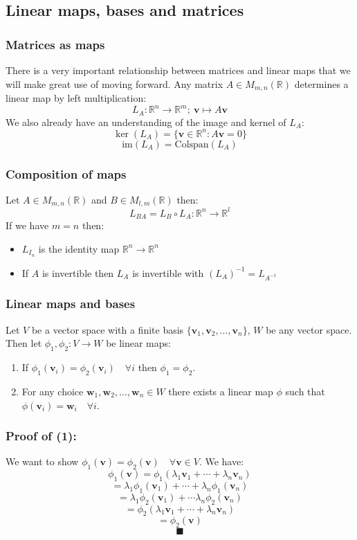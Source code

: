 \documentclass[12pt]{article}
\newcommand{\arbvec}[2]{\ensuremath{\textbf{#1}_1,\textbf{#1}_2,\dots,\textbf{#1}_{#2}}}
\newcommand{\genvec}[3]{#1_1\textbf{#2}_1+\cdots + #1_#3\textbf{#2}_#3}
\begin{document}
\subsection*{Linear maps, bases and matrices}
\subsubsection*{Matrices as maps}
There is a very important relationship between matrices and linear maps that we will make great use of moving forward. Any matrix \(A\in M_{m,n}(\mathbb{R})\) determines a linear map by left multiplication:
\[L_A:\mathbb{R}^n\to\mathbb{R}^m;\ \textbf{v}\mapsto A\textbf{v}\]
We also already have an understanding of the image and kernel of \(L_A\):
\[\ker{(L_A)}=\{\textbf{v}\in\mathbb{R}^n:A\textbf{v}=0\}\]
\[\text{im}(L_A)=\text{Colspan}(L_A)\]
\subsubsection*{Composition of maps}
Let \(A\in M_{m,n}(\mathbb{R})\) and \(B\in M_{l,m}(\mathbb{R})\) then:
\[L_{BA}=L_B\circ L_A: \mathbb{R}^n\to\mathbb{R}^l\]
If we have \(m=n\) then:
\begin{itemize}
    \item \(L_{I_n}\) is the identity map \(\mathbb{R}^n\to\mathbb{R}^n\)
    \item If \(A\) is invertible then \(L_A\) is invertible with \((L_A)^{-1}=L_{A^{-1}}\)
\end{itemize}
\subsubsection*{Linear maps and bases}
Let \(V\) be a vector space with a finite basis \(\{\arbvec{v}{n}\}\), \(W\) be any vector space. Then let \(\phi_1,\phi_2:V\to W\) be linear maps:
\begin{enumerate}

    \item If \(\phi_1(\textbf{v}_i)=\phi_2(\textbf{v}_i)\quad \forall i\) then \(\phi_1=\phi_2\).
    \item For any choice \(\arbvec{w}{n}\in W\) there exists a linear map \(\phi\) such that \(\phi(\textbf{v}_i)=\textbf{w}_i\quad \forall i\).
\end{enumerate}
\subsubsection*{Proof of (1):}
We want to show \(\phi_1(\textbf{v})=\phi_2(\textbf{v})\quad \forall \textbf{v}\in V\). We have:
\[\phi_1(\textbf{v})=\phi_1(\lambda_1\textbf{v}_1+\cdots + \lambda_n\textbf{v}_n)\]
\[=\lambda_1\phi_1(\textbf{v}_1)+\cdots+\lambda_n\phi_1(\textbf{v}_n)\]
\[=\lambda_1\phi_2(\textbf{v}_1)+\cdots \lambda_n\phi_2(\textbf{v}_n)\]
\[=\phi_2(\genvec{\lambda}{v}{n})\]
\[=\phi_2(\textbf{v})\]
\[\blacksquare\]
\end{document}
